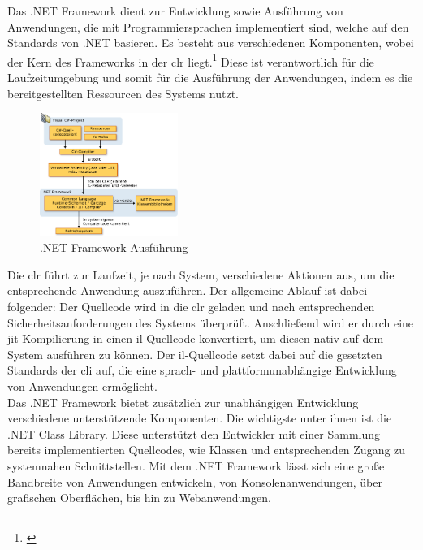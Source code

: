Das .NET Framework dient zur Entwicklung sowie Ausführung von Anwendungen, die mit Programmiersprachen implementiert sind, welche auf den Standards von .NET basieren. Es besteht aus verschiedenen Komponenten, wobei der Kern des Frameworks in der \gls{clr} liegt.\footnote{\citep[vgl.][Overview of the .NET Framework]{Microsoft.Overviewof}\label{note42}} Diese ist verantwortlich für die Laufzeitumgebung und somit für die Ausführung der Anwendungen, indem es die bereitgestellten Ressourcen des Systems nutzt.
\newpage
\begin{figure}
	\begin{center}
		\includegraphics[width=0.4\textwidth]{images/technische_grundlagen/net_aufbau.jpeg}
	\end{center}
	\caption{.NET Framework Ausführung \cite{Microsoft.Introductionto}}
	\label{fig:net}
\end{figure}

\noindent
Die \gls{clr} führt zur Laufzeit, je nach System, verschiedene Aktionen aus, um die entsprechende Anwendung auszuführen. Der allgemeine Ablauf ist dabei folgender: Der Quellcode wird in die \gls{clr} geladen und nach entsprechenden Sicherheitsanforderungen des Systems überprüft. Anschließend wird er durch eine \gls{jit} Kompilierung in einen \gls{il}-Quellcode konvertiert, um diesen nativ auf dem System ausführen zu können. Der \gls{il}-Quellcode setzt dabei auf die gesetzten Standards der \gls{cli} auf, die eine sprach- und plattformunabhängige Entwicklung von Anwendungen ermöglicht.\\
Das .NET Framework bietet zusätzlich zur unabhängigen Entwicklung verschiedene unterstützende Komponenten. Die wichtigste unter ihnen ist die .NET Class Library. Diese unterstützt den Entwickler mit einer Sammlung bereits implementierten Quellcodes, wie Klassen und entsprechenden Zugang zu systemnahen Schnittstellen. Mit dem .NET Framework lässt sich eine große Bandbreite von Anwendungen entwickeln, von Konsolenanwendungen, über grafischen Oberflächen, bis hin zu Webanwendungen.\\

